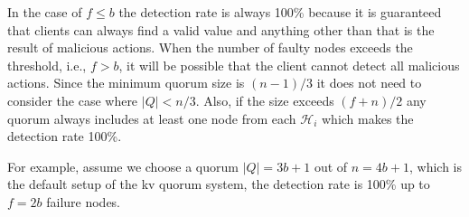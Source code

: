 In the case of $f \le b$ the detection rate is always 100\% because it is
guaranteed that clients can always find a valid value and anything
other than that is the result of malicious actions. When the number of
faulty nodes exceeds the threshold, i.e., $f > b$, it will be possible that
the client cannot detect all malicious actions. Since the minimum
quorum size is $(n-1)/3$ it does not need to consider the case where
$|Q| < n/3$. Also, if the size exceeds $(f+n)/2$ any quorum always
includes at least one node from each $\mathcal{H}_i$ which makes the
detection rate 100\%.

\ifdefined\ABSTRACT
\else
{}
\fi

For example, assume we choose a quorum $|Q| = 3b+1$ out of $n = 4b+1$,
which is the default setup of the kv quorum system, the detection rate
is 100\% up to $f = 2b$ failure nodes.

\ifdefined\ABSTRACT
\else
{}
\fi
